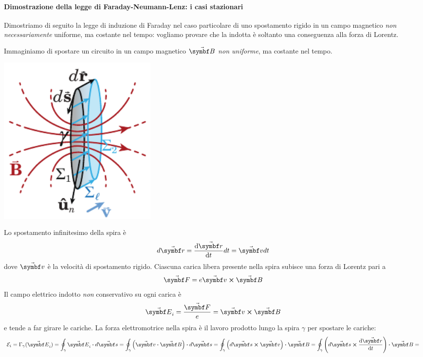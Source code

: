 \paragraph{Dimostrazione della legge di Faraday-Neumann-Lenz: i casi stazionari}
Dimostriamo di seguito la legge di induzione di Faraday nel caso particolare di uno spostamento rigido in un campo magnetico \textit{non necessariamente} uniforme, ma costante nel tempo: vogliamo provare che la \fem indotta è soltanto una conseguenza alla forza di Lorentz.
\begin{demonstration}
	Immaginiamo di spostare un circuito in un campo magnetico $\vba{B}$ \textit{non uniforme}, ma costante nel tempo.
	\begin{center}
		\includegraphics[width=0.35\textwidth]{images/chp10/chp10leggefaradaydim1.pdf}
	\end{center}
	Lo spostamento infinitesimo della spira è
	\begin{equation*}
		d\vba{r}=\dv{\vba{r}}{t}dt=\vba{v}dt
	\end{equation*}
	dove $\vba{v}$ è la velocità di spostamento rigido.	Ciascuna carica libera presente nella spira subisce una forza di Lorentz pari a
	\begin{equation*}
		\vba{F}=e\vba{v}\cross\vba{B}
	\end{equation*}
	Il campo elettrico indotto \textit{non} conservativo su ogni carica è
	\begin{equation*}
		\vba{E}_i=\frac{\vba{F}}{e}=\vba{v}\cross\vba{B}
	\end{equation*}
	e tende a far girare le cariche. La forza elettromotrice nella spira è il lavoro prodotto lungo la spira $\gamma$ per spostare le cariche:
	\begin{align*}
		\mathcal{E}_i&=\Gamma_{\gamma}(\vba{E}_i)=\oint_{\gamma} \vba{E}_i\vdot d\vba{s}=\oint_{\gamma} \left(\vba{v}\vdot \vba{B}\right)\vdot d\vba{s}=\oint_{\gamma} \left(d\vba{s}\cross\vba{v}\right)\vdot \vba{B} = \oint_{\gamma} \left(d\vba{s}\cross\dv{\vba{r}}{t}\right)\vdot \vba{B}=\\

\end{align*}
\end{demonstration}
